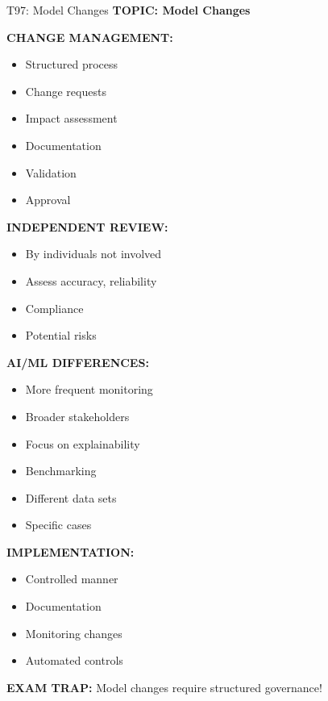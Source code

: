 \documentclass[8pt]{beamer}
\begin{document}
	\begin{frame}{T97: Model Changes}
		\fontsize{6.5}{7.5}\selectfont
		\textbf{TOPIC: Model Changes}
		
		\vspace{0.1cm}
		\textbf{CHANGE MANAGEMENT:}
		\begin{itemize}
			\item Structured process
			\item Change requests
			\item Impact assessment
			\item Documentation
			\item Validation
			\item Approval
		\end{itemize}
		
		\vspace{0.1cm}
		\textbf{INDEPENDENT REVIEW:}
		\begin{itemize}
			\item By individuals not involved
			\item Assess accuracy, reliability
			\item Compliance
			\item Potential risks
		\end{itemize}
		
		\vspace{0.1cm}
		\textbf{AI/ML DIFFERENCES:}
		\begin{itemize}
			\item More frequent monitoring
			\item Broader stakeholders
			\item Focus on explainability
			\item Benchmarking
			\item Different data sets
			\item Specific cases
		\end{itemize}
		
		\vspace{0.1cm}
		\textbf{IMPLEMENTATION:}
		\begin{itemize}
			\item Controlled manner
			\item Documentation
			\item Monitoring changes
			\item Automated controls
		\end{itemize}
		
		\textcolor{myred}{\textbf{EXAM TRAP:}} Model changes require \textcolor{myblue}{structured governance}!
	\end{frame}
	
\end{document}
